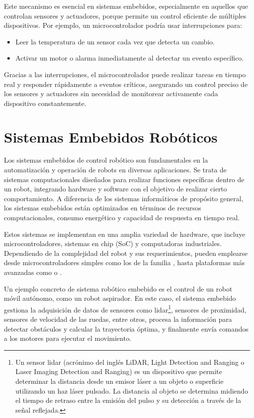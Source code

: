 Este mecanismo es esencial en sistemas embebidos, especialmente en aquellos que controlan sensores y actuadores, porque permite un control eficiente de múltiples dispositivos. Por ejemplo, un microcontrolador podría usar interrupciones para:

\begin{itemize}
    \item Leer la temperatura de un sensor cada vez que detecta un cambio.
    \item Activar un motor o alarma inmediatamente al detectar un evento específico.
\end{itemize}

Gracias a las interrupciones, el microcontrolador puede realizar tareas en tiempo real y responder rápidamente a eventos críticos, asegurando un control preciso de los sensores y actuadores sin necesidad de monitorear activamente cada dispositivo constantemente.


\section{Sistemas Embebidos Robóticos}


Los sistemas embebidos de control robótico son fundamentales en la automatización y operación de robots en diversas aplicaciones. Se trata de sistemas computacionales diseñados para realizar funciones específicas dentro de un robot, integrando hardware y software con el objetivo de realizar cierto comportamiento. A diferencia de los sistemas informáticos de propósito general, los sistemas embebidos están optimizados en términos de recursos computacionales, consumo energético y capacidad de respuesta en tiempo real.

Estos sistemas se implementan en una amplia variedad de hardware, que incluye microcontroladores, sistemas en chip (SoC) y computadoras industriales. Dependiendo de la complejidad del robot y sus requerimientos, pueden emplearse desde microcontroladores simples como los de la familia \cite{stm32}, hasta plataformas más avanzadas como \cite{raspMicro} o \cite{arduinoMicro}.

Un ejemplo concreto de sistema robótico embebido es el control de un robot móvil autónomo, como un robot aspirador. En este caso, el sistema embebido gestiona la adquisición de datos de sensores como lidar\footnote{Un sensor lidar​ (acrónimo del inglés LiDAR, Light Detection and Ranging o Laser Imaging Detection and Ranging) es un dispositivo que permite determinar la distancia desde un emisor láser a un objeto o superficie utilizando un haz láser pulsado. La distancia al objeto se determina midiendo el tiempo de retraso entre la emisión del pulso y su detección a través de la señal reflejada.}, sensores de proximidad, sensores de velocidad de las ruedas, entre otros, procesa la información para detectar obstáculos y calcular la trayectoria óptima, y finalmente envía comandos a los motores para ejecutar el movimiento.

